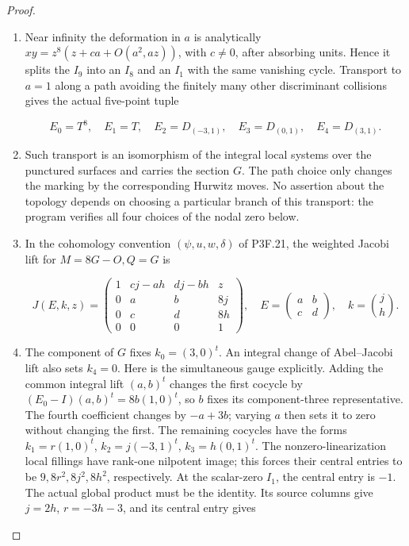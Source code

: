 \begin{proof}
\begin{enumerate}[label=\arabic*.]
\item Near infinity the deformation in \(a\) is analytically
\(xy=z^8(z+c a+O(a^2,az))\), with \(c\ne0\), after absorbing
units.  Hence it splits the \(I_9\) into an \(I_8\) and an
\(I_1\) with the same vanishing cycle.  Transport to \(a=1\)
along a path avoiding the finitely many other discriminant
collisions gives the actual five-point tuple

\[
 E_0=T^8,\quad E_1=T,\quad E_2=D_{(-3,1)},\quad
 E_3=D_{(0,1)},\quad E_4=D_{(3,1)}.
\]

\item Such transport is an isomorphism of the integral local systems
over the punctured surfaces and carries the section \(G\).
The path choice only changes the marking by the corresponding
Hurwitz moves.  No assertion about the topology depends on choosing
a particular branch of this transport: the program verifies all
four choices of the nodal zero below.

\item In the cohomology convention \((\psi,u,w,\delta)\) of P3F.21,
the weighted Jacobi lift for \(M=8G-O,Q=G\) is

\[
 J(E,k,z)=
 \begin{pmatrix}
 1&cj-ah&dj-bh&z\\
 0&a&b&8j\\
 0&c&d&8h\\
 0&0&0&1
 \end{pmatrix},
 \quad E=\begin{pmatrix}a&b\\c&d\end{pmatrix},
 \quad k=\binom jh.
\]

\item The component of \(G\) fixes \(k_0=(3,0)^t\).  An integral
change of Abel--Jacobi lift also sets \(k_4=0\).  Here is the
simultaneous gauge explicitly.  Adding the common integral lift
\((a,b)^t\) changes the first cocycle by
\((E_0-I)(a,b)^t=8b(1,0)^t\), so \(b\) fixes its component-three
representative.  The fourth coefficient changes by \(-a+3b\);
varying \(a\) then sets it to zero without changing the first.
The remaining
cocycles have the forms
\(k_1=r(1,0)^t\), \(k_2=j(-3,1)^t\),
\(k_3=h(0,1)^t\).  The nonzero-linearization local fillings
have rank-one nilpotent image; this forces their central entries
to be \(9,8r^2,8j^2,8h^2\), respectively.  At the scalar-zero
\(I_1\), the central entry is \(-1\).  The actual global product
must be the identity.  Its source columns give
\(j=2h\), \(r=-3h-3\), and its central entry gives


\end{enumerate}
\end{proof}
